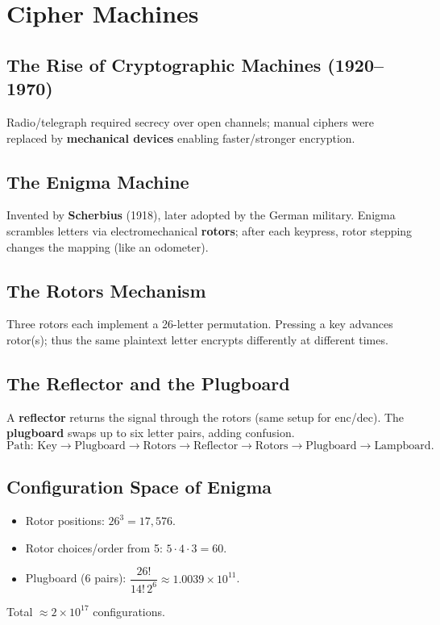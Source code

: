 \section{Cipher Machines}

\subsection{The Rise of Cryptographic Machines (1920–1970)}

Radio/telegraph required secrecy over open channels; manual ciphers were replaced by \textbf{mechanical devices} enabling faster/stronger encryption.

\subsection{The Enigma Machine}

Invented by \textbf{Scherbius} (1918), later adopted by the German military. Enigma scrambles letters via electromechanical \textbf{rotors}; after each keypress, rotor stepping changes the mapping (like an odometer).

\subsection{The Rotors Mechanism}

Three rotors each implement a 26-letter permutation. Pressing a key advances rotor(s); thus the same plaintext letter encrypts differently at different times.

\subsection{The Reflector and the Plugboard}

A \textbf{reflector} returns the signal through the rotors (same setup for enc/dec). The \textbf{plugboard} swaps up to six letter pairs, adding confusion.
\[
\text{Path: Key} \to \text{Plugboard} \to \text{Rotors} \to \text{Reflector} \to \text{Rotors} \to \text{Plugboard} \to \text{Lampboard}.
\]

\subsection{Configuration Space of Enigma}

\begin{itemize}
  \item Rotor positions: \(26^3 = 17{,}576\).
  \item Rotor choices/order from 5: \(5 \cdot 4 \cdot 3 = 60\).
  \item Plugboard (6 pairs): \(\dfrac{26!}{14!\,2^6} \approx 1.0039\times 10^{11}\).
\end{itemize}
Total \(\approx 2\times 10^{17}\) configurations.

